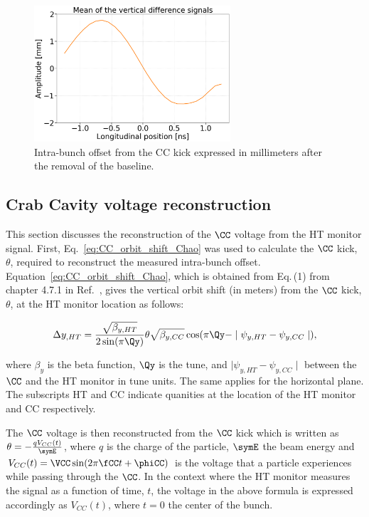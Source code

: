 \begin{figure}[!h]
   \centering         
   \includegraphics[width=0.65\textwidth]{images/Ch4/HT_corrected__20180530_135105_baseline_correction_new_version.png}
       \caption{Intra-bunch offset from the CC kick expressed in millimeters after the removal of the baseline.}
       \label{fig:HT_baseline_correction_crabbing_mm}
\end{figure}


 \subsection{Crab Cavity voltage reconstruction}\label{sec:Vcc_calibration}
 This section discusses the reconstruction of the $\CC$ voltage from the HT monitor signal. First, Eq.~\eqref{eq:CC_orbit_shift_Chao} was used to calculate the $\CC$ kick, $\theta$, required to reconstruct the measured intra-bunch offset. Equation~\eqref{eq:CC_orbit_shift_Chao}, which is obtained from Eq.\,(1) from chapter 4.7.1 in Ref.~\cite{Chao:1490001}, gives the vertical orbit shift (in meters) from the $\CC$ kick, $\theta$, at the HT monitor location as follows:

\begin{equation}\label{eq:CC_orbit_shift_Chao}
   \Delta y_{,HT} = \frac{\sqrt{\beta_{y, HT}}}{2 \sin(\pi \Qy)} \theta \sqrt{\beta_{y, CC}} \cos(\pi \Qy - \mid \psi_{y, HT} - \psi_{y, CC} \mid),
\end{equation}

where $\beta_y$ is the beta function, $\Qy$ is the tune, and $\mid \psi_{y, HT} - \psi_{y, CC} \mid$ between the $\CC$ and the HT monitor in tune units. The same applies for the horizontal plane. The subscripts HT and CC indicate quanities at the location of the HT monitor and CC respectively.

The $\CC$ voltage is then reconstructed from the $\CC$ kick which is written as $\theta = - \frac{q V_{CC}(t)}{\symE}$, where $q$ is the charge of the particle, $\symE$ the beam energy and $V_{CC}(t) = \VCC \sin(2 \pi \fCC t + \phiCC) $ is the voltage that a particle experiences while passing through the $\CC$. In the context where the HT monitor measures the signal as a function of time, $t$, the voltage in the above formula is expressed accordingly as $V_{CC}(t)$, where $t=0$ the center of the bunch.

